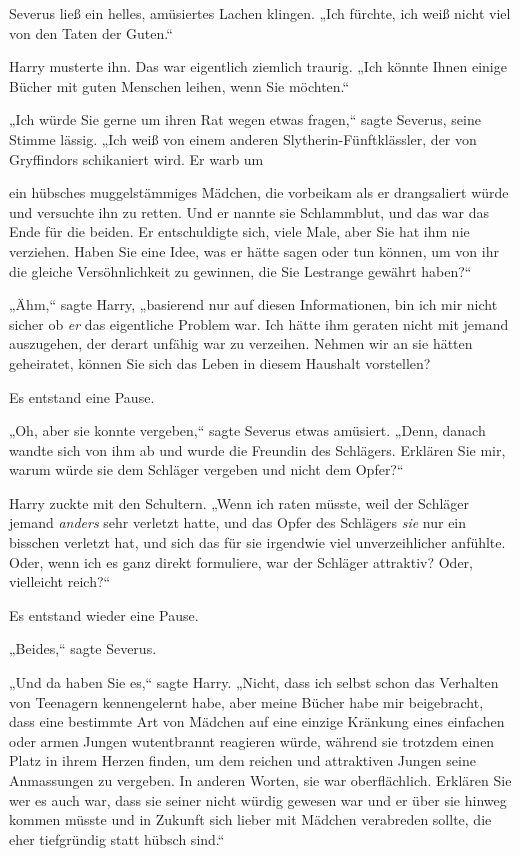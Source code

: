 {Severus ließ ein helles, amüsiertes Lachen klingen. „Ich fürchte, ich weiß nicht viel von den Taten der Guten.“

Harry musterte ihn. Das war eigentlich ziemlich traurig. „Ich könnte Ihnen einige Bücher mit guten Menschen leihen, wenn Sie möchten.“

„Ich würde Sie gerne um ihren Rat wegen etwas fragen,“ sagte Severus, seine Stimme lässig. „Ich weiß von einem anderen Slytherin-Fünftklässler, der von Gryffindors schikaniert wird. Er warb um

ein hübsches muggelstämmiges Mädchen, die vorbeikam als er drangsaliert würde und versuchte ihn zu retten. Und er nannte sie Schlammblut, und das war das Ende für die beiden. Er entschuldigte sich, viele Male, aber Sie hat ihm nie verziehen. Haben Sie eine Idee, was er hätte sagen oder tun können, um von ihr die gleiche Versöhnlichkeit zu gewinnen, die Sie Lestrange gewährt haben?“

„Ähm,“ sagte Harry, „basierend nur auf diesen Informationen, bin ich mir nicht sicher ob \emph{er} das eigentliche Problem war. Ich hätte ihm geraten nicht mit jemand auszugehen, der derart unfähig war zu verzeihen. Nehmen wir an sie hätten geheiratet, können Sie sich das Leben in diesem Haushalt vorstellen?

Es entstand eine Pause.

„Oh, aber sie konnte vergeben,“ sagte Severus etwas amüsiert. „Denn, danach wandte sich von ihm ab und wurde die Freundin des Schlägers. Erklären Sie mir, warum würde sie dem Schläger vergeben und nicht dem Opfer?“

Harry zuckte mit den Schultern. „Wenn ich raten müsste, weil der Schläger jemand \emph{anders} sehr verletzt hatte, und das Opfer des Schlägers \emph{sie} nur ein bisschen verletzt hat, und sich das für sie irgendwie viel unverzeihlicher anfühlte. Oder, wenn ich es ganz direkt formuliere, war der Schläger attraktiv? Oder, vielleicht reich?“

Es entstand wieder eine Pause.

„Beides,“ sagte Severus.

„Und da haben Sie es,“ sagte Harry. „Nicht, dass ich selbst schon das Verhalten von Teenagern kennengelernt habe, aber meine Bücher habe mir beigebracht, dass eine bestimmte Art von Mädchen auf eine einzige Kränkung eines einfachen oder armen Jungen wutentbrannt reagieren würde, während sie trotzdem einen Platz in ihrem Herzen finden, um dem reichen und attraktiven Jungen seine Anmassungen zu vergeben. In anderen Worten, sie war oberflächlich. Erklären Sie wer es auch war, dass sie seiner nicht würdig gewesen war und er über sie hinweg kommen müsste und in Zukunft sich lieber mit Mädchen verabreden sollte, die eher tiefgründig statt hübsch sind.“

}
